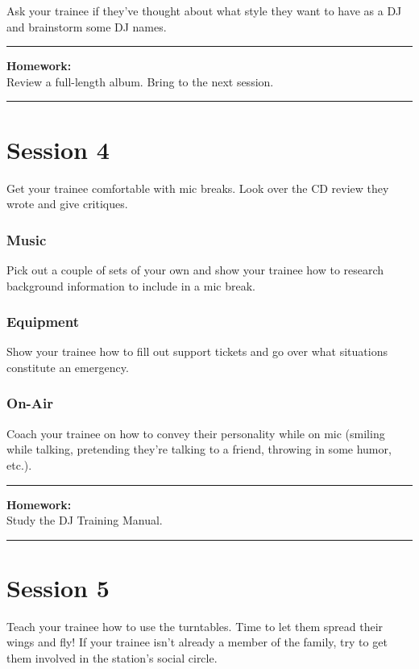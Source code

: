 \documentclass[]{witrman}
\newcommand{\makehomework}[1]{%
    \begin{samepage}
        \vspace{2pt}
        \rule{\textwidth}{1pt}
        \textbf{Homework:}\\
        #1\\
        \rule[3pt]{\textwidth}{1pt}
    \end{samepage}
}
\begin{document}
Ask your trainee if they've thought about what style they want to have as a DJ
and brainstorm some DJ names.

\makehomework{Review a full-length album.  Bring to the next session.}


\vspace{-1pc}
\chapter{Session 4}

Get your trainee comfortable with mic breaks.  Look over the CD review they
wrote and give critiques.

\subsection{Music}

Pick out a couple of sets of your own and show your trainee how to research
background information to include in a mic break.

\subsection{Equipment}

Show your trainee how to fill out support tickets and go over what situations
constitute an emergency.

\subsection{On-Air}

Coach your trainee on how to convey their personality while on mic (smiling
while talking, pretending they're talking to a friend, throwing in some humor,
etc.).

\makehomework{Study the DJ Training Manual.}


\chapter{Session 5}

Teach your trainee how to use the turntables.  Time to let them spread their
wings and fly!  If your trainee isn't already a member of the family, try to get
them involved in the station's social circle.
\end{document}
